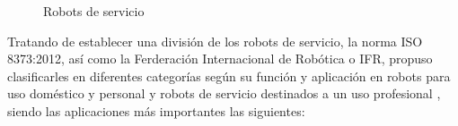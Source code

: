  \begin{figure}[h!]
    \begin{center}
      \subcapcentertrue
      \hspace{2mm}
      \hspace{2mm}
    \end{center}
    \caption{Robots de servicio}
    \label{fig:Robots_servicio}
  \end{figure}

\pagebreak

Tratando de establecer una división de los robots de servicio, la norma ISO 8373:2012, así como la Ferderación Internacional de Robótica o IFR, propuso clasificarles en diferentes categorías según su función y aplicación en robots para uso doméstico y personal y robots de servicio destinados a un uso profesional \cite{Gonzalez21}, siendo las aplicaciones más importantes las siguientes:

